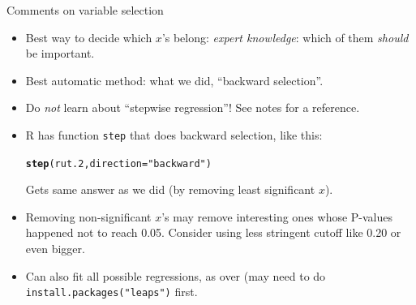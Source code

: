 \documentclass[unknownkeysallowed]{beamer}\usepackage[]{graphicx}\usepackage[]{color}
\makeatletter
\newcommand{\hlstr}[1]{\textcolor[rgb]{0.192,0.494,0.8}{#1}}%
\newcommand{\hlstd}[1]{\textcolor[rgb]{0.345,0.345,0.345}{#1}}%
\newcommand{\hlkwc}[1]{\textcolor[rgb]{0.333,0.667,0.333}{#1}}%
\newcommand{\hlkwd}[1]{\textcolor[rgb]{0.737,0.353,0.396}{\textbf{#1}}}%
\newenvironment{kframe}{%
 \def\at@end@of@kframe{}%
 \ifinner\ifhmode%
  \def\at@end@of@kframe{\end{minipage}}%
  \begin{minipage}{\columnwidth}%
 \fi\fi%
 \def\FrameCommand##1{\hskip\@totalleftmargin \hskip-\fboxsep
 \colorbox{shadecolor}{##1}\hskip-\fboxsep
     \hskip-\linewidth \hskip-\@totalleftmargin \hskip\columnwidth}%
 \MakeFramed {\advance\hsize-\width
   \@totalleftmargin\z@ \linewidth\hsize
   \@setminipage}}%
 {\par\unskip\endMakeFramed%
 \at@end@of@kframe}
\newenvironment{knitrout}{}{} %
\makeatother
\begin{document}
\begin{frame}[fragile]{Comments on variable selection}

  \begin{itemize}
  \item Best way to decide which $x$'s belong: \emph{expert
      knowledge}: which of them \emph{should} be important.
  \item Best automatic method: what we did, ``backward selection''.
  \item Do \emph{not} learn about ``stepwise regression''! See notes
    for a reference.
  \item R has function \texttt{step} that does backward selection,
    like this:
\begin{knitrout}
\color{fgcolor}\begin{kframe}
\begin{alltt}
\hlkwd{step}\hlstd{(rut.2,}\hlkwc{direction}\hlstd{=}\hlstr{"backward"}\hlstd{)}
\end{alltt}
\end{kframe}
\end{knitrout}
Gets same answer as we did (by removing least significant $x$).
\item Removing non-significant $x$'s may remove interesting ones whose
  P-values happened not to reach 0.05. Consider using less stringent
  cutoff like 0.20 or even bigger.
\item Can also fit all possible regressions, as over (may need to do
  \texttt{install.packages("leaps")} first.

 \end{itemize}
  
\end{frame}
\end{document}

